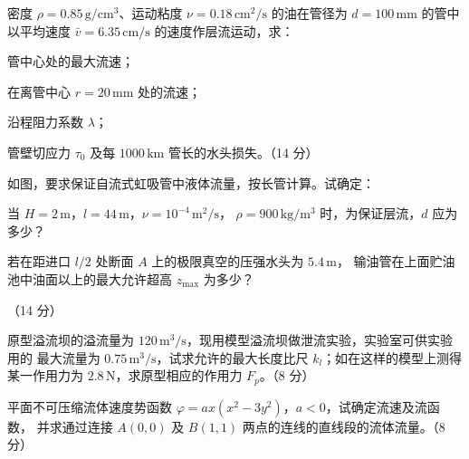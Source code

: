 \begin{ti}
  \item 密度 $\rho=0.85\,\mathrm{g/cm^3}$、运动粘度 $\nu=0.18\,\mathrm{cm^2/s}$ 的油在管径为
  $d=100\,\mathrm{mm}$ 的管中以平均速度 $\bar v=6.35\,\mathrm{cm/s}$ 的速度作层流运动，求：
  \begin{xiaowen}
    \item 管中心处的最大流速；
    \item 在离管中心 $r=20\,\mathrm{mm}$ 处的流速；
    \item 沿程阻力系数 $\lambda$；
    \item 管壁切应力 $\tau_0$ 及每 $1000\,\mathrm{km}$ 管长的水头损失。（14 分）
  \end{xiaowen}
  \hfill{}

  \item 如图，要求保证自流式虹吸管中液体流量，按长管计算。试确定：
  \begin{xiaowen}
    \item 当 $H=2\,\mathrm{m}$，$l=44\,\mathrm{m}$，$\nu=10^{-4}\,\mathrm{m^2/s}$，
      $\rho=900\,\mathrm{kg/m^3}$ 时，为保证层流，$d$ 应为多少？
    \item 若在距进口 $l/2$ 处断面 $A$ 上的极限真空的压强水头为 $5.4\,\mathrm{m}$，
      输油管在上面贮油池中油面以上的最大允许超高 $z_{\max}$ 为多少？
  \end{xiaowen}
  （14 分）\hfill{}

  \item 原型溢流坝的溢流量为 $120\,\mathrm{m^3/s}$，现用模型溢流坝做泄流实验，实验室可供实验用的
  最大流量为 $0.75\,\mathrm{m^3/s}$，试求允许的最大长度比尺 $k_l$；如在这样的模型上测得某一作用力为
  $2.8\,\mathrm{N}$，求原型相应的作用力 $F_p$。（8 分）\hfill{}

  \item 平面不可压缩流体速度势函数 $\varphi=ax(x^2-3y^2)$，$a<0$，试确定流速及流函数，
  并求通过连接 $A(0,0)$ 及 $B(1,1)$ 两点的连线的直线段的流体流量。（8 分）\hfill{}


\end{ti}
